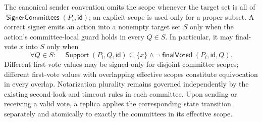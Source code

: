 \documentclass[sigplan,twocolumn,review,anonymous]{acmart}
\newcommand{\func}[1]{\operatorname{\mathsf{#1}}}
\newcommand{\id}{\mathsf{id}}
\newcommand{\SignerCommittees}{\func{SignerCommittees}}
\newcommand{\finalVoted}{\func{finalVoted}}
\begin{document}
The canonical sender convention omits the scope whenever the target set is all of
\(\SignerCommittees(P_i,\id)\); an explicit scope is used only for a proper subset.  A correct signer
emits an action into a nonempty target set \(S\) only when the action's committee-local guard holds in
every \(Q\in S\).  In particular, it may final-vote \(x\) into \(S\) only when
\[
\forall Q\in S:\quad
\func{Support}(P_i,Q,\id)\subseteq\{x\}\wedge\neg\finalVoted(P_i,\id,Q).
\]  Different first-vote values may be signed only for disjoint committee scopes; different
first-vote values with overlapping effective scopes constitute equivocation in every overlap.
Notarization plurality remains governed independently by the existing second-look and timeout rules in
each committee.  Upon sending or receiving a valid vote, a replica applies the corresponding state
transition separately and atomically to exactly the committees in its effective scope.
\end{document}
